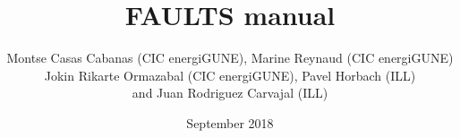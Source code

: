 \documentclass[a4paper,11pt]{report}
\begin{document}
  
\sloppy %
\title{\Huge\bf FAULTS manual}
\author{Montse Casas Cabanas (CIC energiGUNE), Marine Reynaud (CIC energiGUNE) \\
Jokin Rikarte Ormazabal (CIC energiGUNE), Pavel Horbach (ILL) \\
and Juan Rodriguez Carvajal (ILL)}
\date{September 2018}
\maketitle
\tableofcontents




%
%
%
\end{document}
